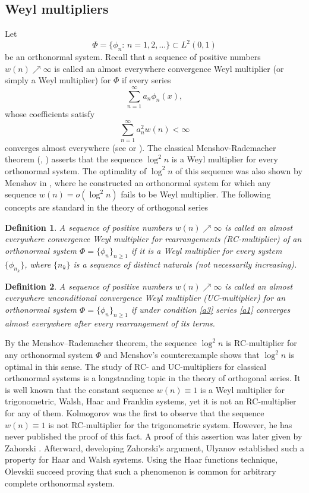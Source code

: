 \documentclass[12pt,reqno,fleqn]{amsart}
\theoremstyle{plain} %
\theoremstyle{remark}
\theoremstyle{plain}
\newtheorem{definition}{Definition}[section]
\numberwithin{equation}{section}
\newcommand {\e }[1]{\eqref{#1}}
\begin{document}
\subsection{Weyl multipliers}\label{S7}
Let 
\begin{equation}\label{r39}
	\Phi=\{\phi_n:\, n=1,2,\ldots\}\subset L^2(0,1)
\end{equation}
be an orthonormal system. Recall that a sequence of positive numbers $w(n)\nearrow\infty$ is called an almost everywhere convergence Weyl multiplier (or simply a Weyl multiplier)  for $\Phi$ if every series 
\begin{equation}\label{a1}
	\sum_{n=1}^\infty a_n\phi_n(x),
\end{equation}
whose coefficients satisfy 
\begin{equation}\label{a3}
	\sum_{n=1}^\infty a_n^2w(n)<\infty
\end{equation}
converges almost everywhere (see \cite{KaSa} or \cite{KaSt}). 
The classical Menshov-Rademacher theorem (\cite{Men},  \cite{Rad}) asserts that the sequence $\log^2 n$ is a Weyl multiplier for every orthonormal system.  The optimality of $\log^2 n$ of this sequence was also shown by Menshov in \cite{Men}, where he constructed an orthonormal system for which any sequence $w(n)=o(\log^2n)$ fails to be Weyl multiplier. The following concepts are standard in the theory of orthogonal series
\begin{definition}
	A sequence of positive numbers $w(n)\nearrow\infty$ is called an almost everywhere convergence Weyl multiplier for rearrangements (RC-multiplier) of an orthonormal system $\Phi=\{\phi_n\}_{n\ge 1}$ if it is a Weyl multiplier for every system $\{\phi_{n_k}\}$, where $\{n_k\}$ is a sequence of distinct  naturals (not necessarily increasing).
\end{definition}
\begin{definition}
	A sequence of positive numbers $w(n)\nearrow\infty$ is called an almost everywhere unconditional convergence Weyl multiplier (UC-multiplier) for an orthonormal system $\Phi=\{\phi_n\}_{n\ge 1}$ if  under condition \e{a3} series \e{a1} converges almost everywhere after every rearrangement of its terms.
\end{definition}
By the Menshov–Rademacher theorem, the sequence $\log^2 n$ is RC-multiplier for any orthonormal system $\Phi$ and Menshov's counterexample shows that $\log^2 n$ is optimal in this sense. The study of RC- and UC-multipliers for classical orthonormal systems is a longstanding topic in the theory of orthogonal series. It is well known that the constant sequence $w(n)\equiv 1$ is a Weyl multiplier for trigonometric, Walsh, Haar and Franklin systems, yet it is not an RC-multiplier for any of them. Kolmogorov \cite{Kol} was the first to observe that the sequence $w(n)\equiv 1$ is not RC-multiplier for the trigonometric system. However, he has never published the proof of this fact. A proof of this assertion was later given by Zahorski \cite{Zag}. Afterward, developing Zahorski's argument, Ul\cprime yanov \cite{Uly6, Uly7} established such a property for Haar and Walsh systems. Using the Haar functions technique, Olevskii \cite{Ole} succeed proving that such a phenomenon is common for arbitrary complete orthonormal system.
\end{document}
